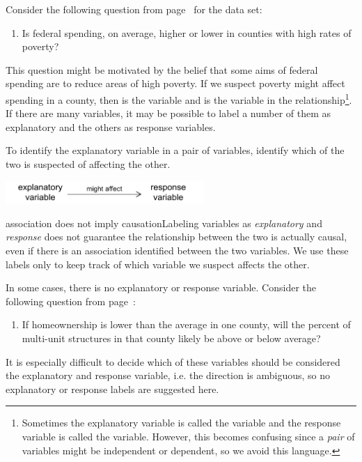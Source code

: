 
Consider the following question from page~\pageref{fedSpendingPovertyQuestion} for the  data set:
\begin{enumerate}
\item[(1)] 
	Is federal spending, on average, higher or lower in counties with high rates of poverty?
\end{enumerate}
This question might be motivated by the belief that some aims of federal spending are to reduce areas of high poverty. If we suspect poverty might affect spending in a county, then  is the  variable and  is the  variable in the relationship\footnote{Sometimes the explanatory variable is called the  variable and the response variable is called the  variable. However, this becomes confusing since a \emph{pair} of variables might be independent or dependent, so we avoid this language.}. If there are many variables, it may be possible to label a number of them as explanatory and the others as response variables.

\begin{tipBox}{
To identify the explanatory variable in a pair of variables, identify which of the two is suspected of affecting the other.

\hspace{10mm}\includegraphics[height=0.34in]{01/figures/expResp/expResp}}
\end{tipBox}

\begin{caution}{association does not imply causation}{Labeling variables as \emph{explanatory} and \emph{response} does not guarantee the relationship between the two is actually causal, even if there is an association identified between the two variables. We use these labels only to keep track of which variable we suspect affects the other.}
\end{caution}

In some cases, there is no explanatory or response variable. Consider the following question from page~\pageref{ownershipMultiUnitQuestion}:
\begin{enumerate}
\item[(2)] 
	If homeownership is lower than the average in one county, will the percent of multi-unit structures in that county likely be above or below average?
\end{enumerate}
It is especially difficult to decide which of these variables should be considered the explanatory and response variable, %
i.e. the direction is ambiguous, so no explanatory or response labels are suggested here.

